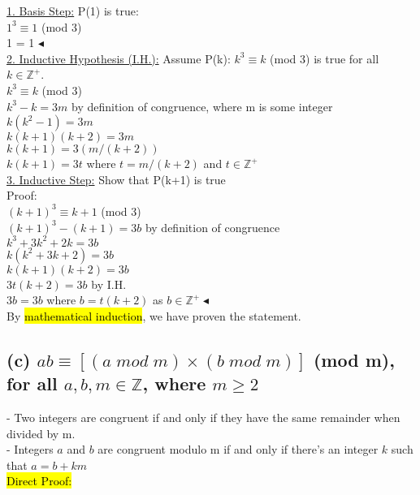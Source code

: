 \documentclass[a4paper, 12pt]{article}
\begin{document}
\underline{1. Basis Step:} P(1) is true:\\

$1^3 \equiv 1$ (mod 3)\\
1 = 1 $\blacktriangleleft$\\

\underline{2. Inductive Hypothesis (I.H.):} Assume P(k): $k^3 \equiv k$ (mod 3) is true for all $k \in \mathbb{Z^+}$.\\

$k^3 \equiv k$ (mod 3)\\
$k^3-k = 3m$ by definition of congruence, where m is some integer \\
$k(k^2-1) = 3m$\\
$k(k+1)(k+2) = 3m$\\
$k(k+1) = 3(m/(k+2))$\\
$k(k+1) = 3t$ where $t = m/(k+2)$ and $t \in \mathbb{Z^+}$\\

\underline{3. Inductive Step:} Show that P(k+1) is true\\

Proof:\\
$(k+1)^3 \equiv k+1$ (mod 3)\\
$(k+1)^3 - (k+1) = 3b$ by definition of congruence\\
$k^3+3k^2+2k = 3b$\\
$k(k^2+3k+2) = 3b$\\
$k(k+1)(k+2) = 3b$\\
$3t(k+2) = 3b$ by I.H.\\
$3b = 3b$ where $b = t(k+2)$ as $b\in \mathbb{Z^+} \blacktriangleleft$\\

By \hl{mathematical induction}, we have proven the statement.\\

\subsection*{(c) $ab \equiv [(a \; mod \; m) \times (b \; mod \; m)]$ (mod m), for all $a, b, m \in \mathbb{Z}$, where $m\geq 2$}
- Two integers are congruent if and only if they have the same remainder when divided by m.\\
- Integers $a$ and $b$ are congruent modulo m if and only if there's an integer $k$ such that $a = b + km$\\

\hl{Direct Proof:}\\
\end{document}
